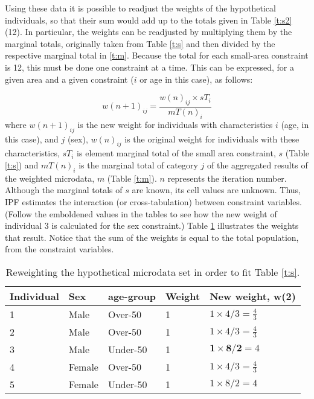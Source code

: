 \documentclass[a4paper,10pt]{article}
\begin{document}
Using these data it is possible to readjust the weights of the hypothetical
individuals, so that their sum would add up to the totals given in Table
\ref{t:s2} (12). In particular, the weights can be readjusted by multiplying
them by
the marginal totals, originally taken from
Table \ref{t:s} and then divided by the respective marginal total in \ref{t:m}.
Because the total for each small-area constraint is 12, this must be
done one constraint at a time. This
can be expressed, for a given area and a given constraint ($i$
or age in this case), as follows:

\begin{equation}
w(n+1)_{ij} = \frac{w(n)_{ij} \times sT_{i}}{mT(n)_{i}}
\label{eq:ipf}
\end{equation}
where $w(n+1)_{ij}$ is the new weight for individuals with characteristics $i$
(age, in this case), and $j$ (sex),  $w(n)_{ij}$ is the original
weight for individuals with these characteristics, $sT_{i}$ is element
marginal total of the small area constraint, $s$
(Table \ref{t:s}) and $mT(n)_{i}$ is the marginal total of category
$j$ of the aggregated results of the weighted
microdata, $m$ (Table \ref{t:m}). $n$ represents the iteration number.
Although the marginal totals of $s$ are known, its cell values
are unknown. Thus, IPF estimates the interaction (or cross-tabulation)
between constraint variables.
(Follow the emboldened values in the tables
to see how the new weight of individual 3 is calculated for the sex constraint.)
Table \ref{t:new-weights} illustrates the weights that result. Notice that the
sum of the weights is equal to the total population, from the constraint
variables.

\begin{table}[htbp]
\centering
\caption{Reweighting the hypothetical microdata set in order to fit
Table \ref{t:s}.}
\begin{tabular}{lllll}
\toprule
{Individual} & {Sex} & {age-group} & {Weight} &
{New weight, w(2)} \\ \midrule
1 & Male & Over-50 & 1 & $1 \times 4/3 = \frac{4}{3}$ \\
2 & Male & Over-50 & 1 & $1 \times 4/3 = \frac{4}{3}$ \\
3 & Male & Under-50 & 1 & $\textbf{1} \times
\textbf{8}/\textbf{2} = 4$ \\
4 & Female & Over-50 & 1 & $1 \times 4/3 = \frac{4}{3}$ \\
5 & Female & Under-50 & 1 & $1 \times 8/2 = 4$ \\
\bottomrule
\end{tabular}
\label{t:new-weights}
\end{table}
\end{document}
